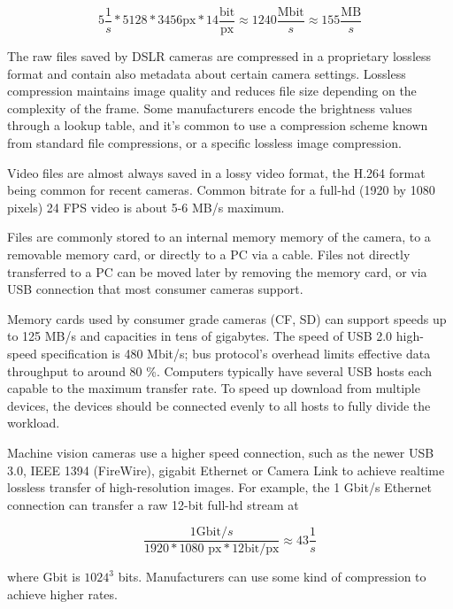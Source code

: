 \begin{equation}
	5\frac{1}{s} * 5128 * 3456 \text{px} * 14 \frac{\text{bit}}{\text{px}} \approx 1240 \frac{\text{Mbit}}{s} \approx 155 \frac{\text{MB}}{s}
\end{equation}


The raw files saved by DSLR cameras are compressed in a proprietary lossless format and contain also metadata about certain camera settings.
Lossless compression maintains image quality and reduces file size depending on the complexity of the frame.
Some manufacturers encode the brightness values through a lookup table, and it's common to use a compression scheme known from standard file compressions, or a specific lossless image compression.

Video files are almost always saved in a lossy video format, the H.264 format being common for recent cameras.
Common bitrate for a full-hd (1920 by 1080 pixels) 24 FPS video is about 5-6 MB/s maximum.


Files are commonly stored to an internal memory memory of the camera, to a removable memory card, or directly to a PC via a cable.
Files not directly transferred to a PC can be moved later by removing the memory card, or via USB connection that most consumer cameras support.

Memory cards used by consumer grade cameras (CF, SD) can support speeds up to 125 MB/s and capacities in tens of gigabytes.
The speed of USB 2.0 high-speed specification is 480 Mbit/s; bus protocol's overhead limits effective data throughput to around 80 \%.
Computers typically have several USB hosts each capable to the maximum transfer rate.
To speed up download from multiple devices, the devices should be connected evenly to all hosts to fully divide the workload.

Machine vision cameras use a higher speed connection, such as the newer USB 3.0, IEEE 1394 (FireWire), gigabit Ethernet or Camera Link to achieve realtime lossless transfer of high-resolution images.
For example, the 1 Gbit/s Ethernet connection can transfer a raw 12-bit full-hd stream at

\begin{equation} \label{eq:gigabit-transfer}
	\frac{1 \text{Gbit}/s}{1920 * 1080 \text{ px} * 12 \text{bit}/\text{px}} \approx 43 \frac{1}{s}
\end{equation}

where Gbit is $1024^3$ bits.
Manufacturers can use some kind of compression to achieve higher rates.

